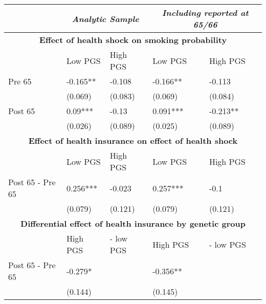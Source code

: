 % 
\begin{tabular}{l| p{3cm}p{3cm}| p{3cm}p{3cm}}
  & \multicolumn{2}{c}{ \textit{Analytic Sample}} & \multicolumn{2}{c}{ \textit{Including reported at 65/66}} \\
 \toprule
  \multicolumn{5}{c}{ \textbf{Effect of health shock on smoking probability}} \\
 \midrule
 & Low PGS & High PGS & Low PGS & High PGS \\ 
   \midrule
Pre 65 & -0.165** & -0.108 & -0.166** & -0.113 \\ 
   & (0.069) & (0.083) & (0.069) & (0.084) \\ 
  Post 65 & 0.09*** & -0.13 & 0.091*** & -0.213** \\ 
   & (0.026) & (0.089) & (0.025) & (0.089) \\ 
   \toprule \multicolumn{5}{c}{ \textbf{Effect of health insurance on effect of health shock}} \\
 \midrule
 & Low PGS & High PGS & Low PGS & High PGS \\ 
   \midrule
Post 65 - Pre 65 & 0.256*** & -0.023 & 0.257*** & -0.1 \\ 
   & (0.079) & (0.121) & (0.079) & (0.121) \\ 
   \toprule \multicolumn{5}{c}{ \textbf{Differential effect of health insurance by genetic group}} \\
 \midrule
 & High PGS  & - low PGS & High PGS  & - low PGS \\ 
   \midrule
Post 65 - Pre 65 & -0.279* &  & -0.356** &  \\ 
   & (0.144) &  & (0.145) &  \\ 
  \end{tabular}
